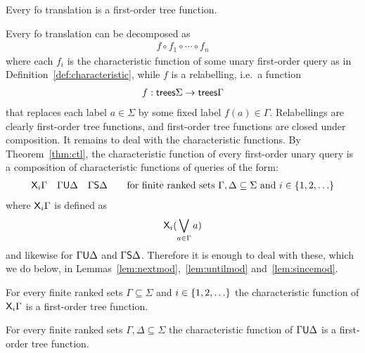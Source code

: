 \begin{lemma}\label{lem:fo-translation} Every fo translation is a first-order tree function.
\end{lemma}
\begin{pr}
    Every fo translation can be decomposed as 
    \begin{align*}
        f \circ f_1 \circ \cdots \circ f_n
    \end{align*}
    where each $f_i$ is the characteristic function of some unary first-order query as in Definition~\ref{def:characteristic}, while $f$ is a relabelling, i.e.~a function
    \begin{align*}
        f : \mathsf {trees} \Sigma \to \mathsf {trees} \Gamma
    \end{align*}
    that replaces each label $a \in \Sigma$ by some fixed label  $f(a) \in \Gamma$. Relabellings are clearly first-order tree functions, and first-order tree functions are closed under composition. It remains to deal with the characteristic functions. By Theorem~\ref{thm:ctl}, the characteristic function of every first-order unary query is a composition of characteristic functions of queries of the form:
    \begin{align*}
        \mathsf X_i \Gamma \quad \Gamma \mathsf U \Delta \quad \Gamma \mathsf S \Delta \qquad \text{for finite ranked sets $\Gamma,\Delta \subseteq \Sigma$ and $i \in \{1,2,\ldots\}$} 
    \end{align*}
    where $\mathsf X_i \Gamma$ is defined as 
    \begin{align*}
        \mathsf X_i (\bigvee_{a \in \Gamma} a) 
    \end{align*}
    and likewise for $\Gamma \mathsf U \Delta $ and $ \Gamma \mathsf S \Delta$. Therefore it is enough to  deal with these, which we do below, in Lemmas~\ref{lem:nextmod},~\ref{lem:untilmod} and~\ref{lem:sincemod}.
    \end{pr}


    \begin{lemma}\label{lem:nextmod}
        For every finite ranked sets $\Gamma \subseteq \Sigma$ and $i \in \{1,2,\ldots\}$ the characteristic function of $\mathsf X_i \Gamma$ is a first-order tree function.
    \end{lemma}
\begin{pr}
    
\end{pr}

\begin{lemma}\label{lem:untilmod}
    For every finite ranked sets $\Gamma, \Delta \subseteq \Sigma$  the characteristic function of $\Gamma \mathsf U \Delta$ is a first-order tree function.
\end{lemma}
\begin{pr}

\end{pr}


